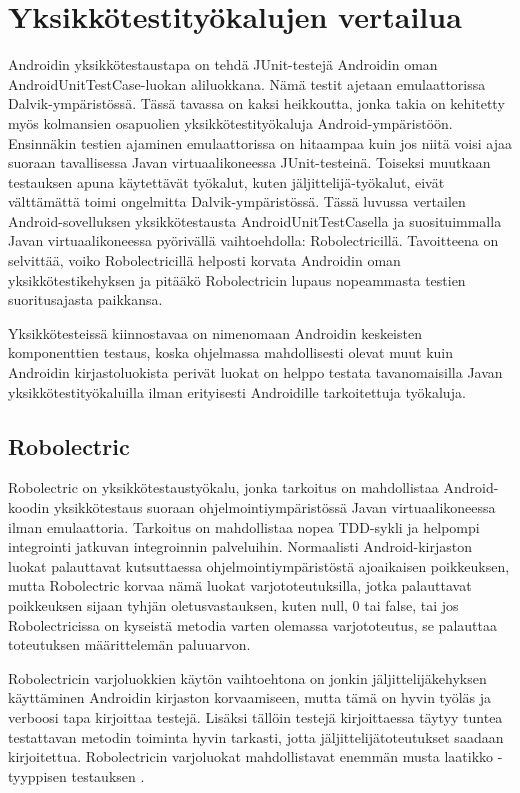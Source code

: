 \section{Yksikkötestityökalujen vertailua}

Androidin yksikkötestaustapa on tehdä JUnit-testejä Androidin oman AndroidUnitTestCase-luokan aliluokkana. Nämä testit ajetaan emulaattorissa Dalvik-ympäristössä. Tässä tavassa on kaksi heikkoutta, jonka takia on kehitetty myös kolmansien osapuolien yksikkötestityökaluja Android-ympäristöön. Ensinnäkin testien ajaminen emulaattorissa on hitaampaa kuin jos niitä voisi ajaa suoraan tavallisessa Javan virtuaalikoneessa JUnit-testeinä. Toiseksi muutkaan testauksen apuna käytettävät työkalut, kuten jäljittelijä-työkalut, eivät välttämättä toimi ongelmitta Dalvik-ympäristössä. Tässä luvussa vertailen Android-sovelluksen yksikkötestausta AndroidUnitTestCasella ja suosituimmalla Javan virtuaalikoneessa pyörivällä vaihtoehdolla: Robolectricillä. Tavoitteena on selvittää, voiko Robolectricillä helposti korvata Androidin oman yksikkötestikehyksen ja pitääkö Robolectricin lupaus nopeammasta testien suoritusajasta paikkansa.

Yksikkötesteissä kiinnostavaa on nimenomaan Androidin keskeisten komponenttien testaus, koska ohjelmassa mahdollisesti olevat muut kuin Androidin kirjastoluokista perivät luokat on helppo testata tavanomaisilla Javan yksikkötestityökaluilla ilman erityisesti Androidille tarkoitettuja työkaluja.

\subsection{Robolectric}

Robolectric on yksikkötestaustyökalu, jonka tarkoitus on mahdollistaa Android-koodin yksikkötestaus suoraan ohjelmointiympäristössä Javan virtuaalikoneessa ilman emulaattoria. Tarkoitus on mahdollistaa nopea TDD-sykli ja helpompi integrointi jatkuvan integroinnin palveluihin. Normaalisti Android-kirjaston luokat palauttavat kutsuttaessa ohjelmointiympäristöstä ajoaikaisen poikkeuksen, mutta Robolectric korvaa nämä luokat varjototeutuksilla, jotka palauttavat poikkeuksen sijaan tyhjän oletusvastauksen, kuten null, 0 tai false, tai jos Robolectricissa on kyseistä metodia varten olemassa varjototeutus, se palauttaa toteutuksen määrittelemän paluuarvon.

Robolectricin varjoluokkien käytön vaihtoehtona on jonkin jäljittelijäkehyksen käyttäminen Androidin kirjaston korvaamiseen, mutta tämä on hyvin työläs ja verboosi tapa kirjoittaa testejä. Lisäksi tällöin testejä kirjoittaessa täytyy tuntea testattavan metodin toiminta hyvin tarkasti, jotta jäljittelijätoteutukset saadaan kirjoitettua. Robolectricin varjoluokat mahdollistavat enemmän musta laatikko -tyyppisen testauksen \cite{robolectric}.

